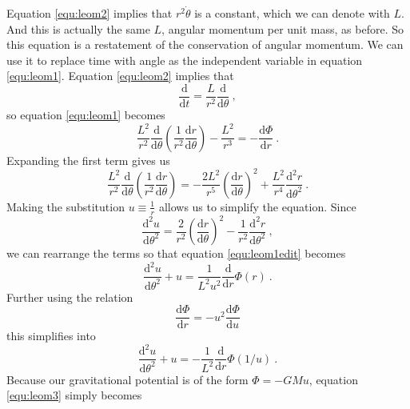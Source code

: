 \documentclass[english, oneside]{HYgradu}
\begin{document}
Equation \ref{equ:leom2} implies that $r^2 \dot{\theta}$ is a constant, which we can denote with $L$. And this is actually the same $L$, angular momentum per unit mass, as before. So this equation is a restatement of the conservation of angular momentum. We can use it to replace time with angle as the independent variable in equation \ref{equ:leom1}. Equation \ref{equ:leom2} implies that
\begin{equation}
\frac{\mathrm{d}}{\mathrm{d} t} = \frac{L}{r^2} \frac{\mathrm{d}}{\mathrm{d} \theta} \ ,
\end{equation}
so equation \ref{equ:leom1} becomes
\begin{equation}
\frac{L^2}{r^2} \frac{\mathrm{d}}{\mathrm{d} \theta} \left( \frac{1}{r^2} \frac{\mathrm{d} r}{\mathrm{d} \theta} \right) - \frac{L^2}{r^3} = -\frac{\mathrm{d} \Phi}{\mathrm{d} r} \label{equ:leom1edit} \ .
\end{equation}
Expanding the first term gives us 
\begin{equation}
\frac{L^2}{r^2} \frac{\mathrm{d}}{\mathrm{d} \theta} \left( \frac{1}{r^2} \frac{\mathrm{d} r}{\mathrm{d} \theta} \right) = -\frac{2 L^2}{r^5} \left( \frac{\mathrm{d} r}{\mathrm{d} \theta} \right)^2 + \frac{L^2}{r^4} \frac{\mathrm{d}^2 r}{\mathrm{d} \theta^2} \ .
\end{equation}
Making the substitution $u \equiv \frac{1}{r}$ allows us to simplify the equation. Since
\begin{equation}
\frac{\mathrm{d}^2 u}{\mathrm{d} \theta^2} = \frac{2}{r^2} \left( \frac{\mathrm{d} r}{\mathrm{d} \theta} \right)^2 - \frac{1}{r^2} \frac{\mathrm{d}^2 r}{\mathrm{d} \theta^2} \ ,
\end{equation}
we can rearrange the terms so that equation \ref{equ:leom1edit} becomes
\begin{equation}
\frac{\mathrm{d}^2 u}{\mathrm{d} \theta^2} + u = \frac{1}{L^2 u^2} \frac{\mathrm{d}}{\mathrm{d} r} \Phi (r) \ .
\end{equation}
Further using the relation
\begin{equation}
\frac{\mathrm{d} \Phi}{\mathrm{d} r} = -u^2 \frac{\mathrm{d} \Phi}{\mathrm{d} u}
\end{equation}
this simplifies into
\begin{equation}
\frac{\mathrm{d}^2 u}{\mathrm{d} \theta^2} + u = -\frac{1}{L^2} \frac{\mathrm{d}}{\mathrm{d} r} \Phi (1/u) \label{equ:leom3} \ .
\end{equation}
Because our gravitational potential is of the form $\Phi = -GMu$, equation \ref{equ:leom3} simply becomes
\end{document}
